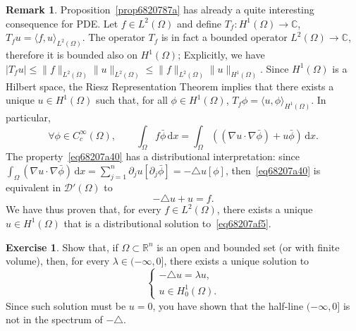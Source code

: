 \documentclass[a4paper,9pt]{amsart}
\newcommand{\scr}[1]{\mathscr{#1}}
\newcommand{\R}{\mathbb{R}}	%
\newcommand{\C}{\mathbb{C}}	%
\newcommand{\did}{\,\mathrm{d}}	%
\newcommand{\de}{\partial}		%
\newcommand{\laplacian}{\triangle}
\newcommand{\grad}{\nabla}
\theoremstyle{plain}
\theoremstyle{definition}
\newtheorem{remark}[proposition]{Remark}
\newtheorem{exercise}[proposition]{Exercise}%
\theoremstyle{remark}
\begin{document}
\begin{remark}\label{rem6820847b}
	Proposition~\ref{prop6820787a} has already a quite interesting consequence for PDE.
	Let $f\in L^2(\Omega)$ and define $T_f:H^1(\Omega)\to\C$, $T_fu = \langle f,u \rangle_{L^2(\Omega)}$.
	The operator $T_f$ is in fact a bounded operator $L^2(\Omega)\to\C$, therefore it is bounded also on $H^1(\Omega)$;
	Explicitly, we have
	$|T_fu| \le \|f\|_{L^2(\Omega)} \|u\|_{L^2(\Omega)} \le \|f\|_{L^2(\Omega)} \|u\|_{H^1(\Omega)}$.
	Since $H^1(\Omega)$ is a Hilbert space, the Riesz Representation Theorem implies that there exists a unique $u\in H^1(\Omega)$ such that, for all $\phi\in H^1(\Omega)$, 
	$T_f\phi = \langle u,\phi \rangle_{H^1(\Omega)}$.
	In particular, 
	\begin{equation}\label{eq68207a40}
		\forall \phi\in C^\infty_c(\Omega),\qquad
		\int_\Omega f \bar\phi \did x 
		= \int_\Omega ( (\grad u\cdot \grad\bar\phi) + u\bar\phi ) \did x .
	\end{equation}
	The property~\eqref{eq68207a40} has a distributional interpretation: 
	since $\int_\Omega (\grad u\cdot \grad\bar\phi) \did x = \sum_{j=1}^n \de_ju[\de_j\bar\phi] = - \laplacian u[\phi]$,
	then~\eqref{eq68207a40} is equivalent in $\scr D'(\Omega)$ to
	\begin{equation}\label{eq68207af5}
		-\laplacian u + u = f .
	\end{equation}
	We have thus proven that, for every $f\in L^2(\Omega)$,
	there exists a unique $u\in H^1(\Omega)$ that is a distributional solution to~\eqref{eq68207af5}.
\end{remark}

\begin{exercise}
	Show that, if $\Omega\subset\R^n$ is an open and bounded set (or with finite volume),
	then, for every $\lambda\in(-\infty,0]$, there exists a unique solution to
	\begin{equation}
	\begin{cases}
		-\laplacian u = \lambda u ,\\
		u\in H^1_0(\Omega) .
	\end{cases}
	\end{equation}
	Since such solution must be $u=0$, you have shown that the half-line $(-\infty,0]$ is not in the spectrum of $-\laplacian$.
\end{exercise}

\end{document}
